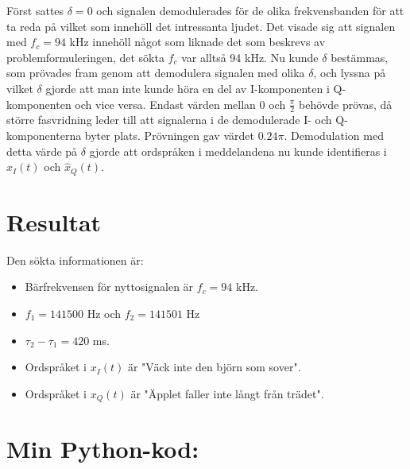\documentclass[10pt,twocolumn]{article}
\begin{document}
Först sattes $\delta = 0$ och signalen demodulerades för de olika
frekvensbanden för att ta reda på vilket som innehöll det intressanta ljudet. Det
visade sig att signalen med $f_c = 94$ kHz innehöll något som liknade det som
beskrevs av problemformuleringen, det sökta $f_c$ var alltså 94 kHz.
Nu kunde $\delta$ bestämmas, som prövades fram genom att demodulera signalen med olika $\delta$, och
lyssna på vilket $\delta$ gjorde att man inte kunde höra en del av I-komponenten i
Q-komponenten och vice versa. Endast värden mellan 0 och $\frac{\pi}{2}$ behövde prövas,
då större fasvridning leder till att signalerna i de demodulerade I- och Q-komponenterna byter plats.
Prövningen gav värdet $0.24\pi$. Demodulation med detta värde på $\delta$ gjorde
att ordspråken i meddelandena nu kunde identifieras i $\hat{x}_I(t)$ och
$\hat{x}_Q(t)$.


\section{Resultat}

Den sökta informationen är:
\begin{itemize}
\item Bärfrekvensen för nyttosignalen är $f_c=94$ kHz.
\item $f_1=141500$ Hz och $f_2=141501$ Hz
\item $\tau_2 - \tau_1 = 420$ ms.
\item Ordspråket i $x_I(t)$ är "Väck inte den björn som sover".
\item Ordspråket i $x_Q(t)$ är "Äpplet faller inte långt från trädet".
\end{itemize}

\clearpage

\onecolumn
\section*{Min Python-kod:}

\end{document}
